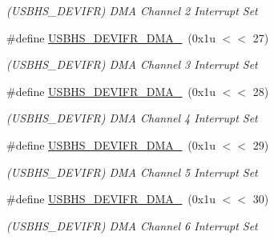 \begin{DoxyCompactItemize}
\begin{DoxyCompactList}\small\item\em (U\+S\+B\+H\+S\+\_\+\+D\+E\+V\+I\+FR) D\+MA Channel 2 Interrupt Set \end{DoxyCompactList}\item 
\mbox{\label{group__SAMS70__USBHS_gaf66bef1e7538546cab2e2801601f3c08}} 
\#define \mbox{\hyperlink{group__SAMS70__USBHS_gaf66bef1e7538546cab2e2801601f3c08}{U\+S\+B\+H\+S\+\_\+\+D\+E\+V\+I\+F\+R\+\_\+\+D\+M\+A\+\_}}~(0x1u $<$$<$ 27)
\begin{DoxyCompactList}\small\item\em (U\+S\+B\+H\+S\+\_\+\+D\+E\+V\+I\+FR) D\+MA Channel 3 Interrupt Set \end{DoxyCompactList}\item 
\mbox{\label{group__SAMS70__USBHS_ga3c95cdd8ee93ef8dfc817fd28088e474}} 
\#define \mbox{\hyperlink{group__SAMS70__USBHS_ga3c95cdd8ee93ef8dfc817fd28088e474}{U\+S\+B\+H\+S\+\_\+\+D\+E\+V\+I\+F\+R\+\_\+\+D\+M\+A\+\_}}~(0x1u $<$$<$ 28)
\begin{DoxyCompactList}\small\item\em (U\+S\+B\+H\+S\+\_\+\+D\+E\+V\+I\+FR) D\+MA Channel 4 Interrupt Set \end{DoxyCompactList}\item 
\mbox{\label{group__SAMS70__USBHS_ga763b06726988c3b3e4a011714464e47a}} 
\#define \mbox{\hyperlink{group__SAMS70__USBHS_ga763b06726988c3b3e4a011714464e47a}{U\+S\+B\+H\+S\+\_\+\+D\+E\+V\+I\+F\+R\+\_\+\+D\+M\+A\+\_}}~(0x1u $<$$<$ 29)
\begin{DoxyCompactList}\small\item\em (U\+S\+B\+H\+S\+\_\+\+D\+E\+V\+I\+FR) D\+MA Channel 5 Interrupt Set \end{DoxyCompactList}\item 
\mbox{\label{group__SAMS70__USBHS_gaf361f8016b9317bd2976526758f54895}} 
\#define \mbox{\hyperlink{group__SAMS70__USBHS_gaf361f8016b9317bd2976526758f54895}{U\+S\+B\+H\+S\+\_\+\+D\+E\+V\+I\+F\+R\+\_\+\+D\+M\+A\+\_}}~(0x1u $<$$<$ 30)
\begin{DoxyCompactList}\small\item\em (U\+S\+B\+H\+S\+\_\+\+D\+E\+V\+I\+FR) D\+MA Channel 6 Interrupt Set \end{DoxyCompactList}\item 

\end{DoxyCompactItemize}
